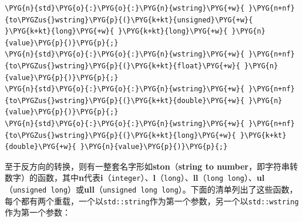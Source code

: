 \begin{codeblockbg}
\begin{Verbatim}[commandchars=\\\{\},breaklines=true,breakanywhere=true,fontsize=\codefont,xleftmargin=17bp]
\PYG{n}{std}\PYG{o}{:}\PYG{o}{:}\PYG{n}{wstring}\PYG{+w}{ }\PYG{n+nf}{to\PYGZus{}wstring}\PYG{p}{(}\PYG{k+kt}{unsigned}\PYG{+w}{ }\PYG{k+kt}{long}\PYG{+w}{ }\PYG{k+kt}{long}\PYG{+w}{ }\PYG{n}{value}\PYG{p}{)}\PYG{p}{;}
\PYG{n}{std}\PYG{o}{:}\PYG{o}{:}\PYG{n}{wstring}\PYG{+w}{ }\PYG{n+nf}{to\PYGZus{}wstring}\PYG{p}{(}\PYG{k+kt}{float}\PYG{+w}{ }\PYG{n}{value}\PYG{p}{)}\PYG{p}{;}
\PYG{n}{std}\PYG{o}{:}\PYG{o}{:}\PYG{n}{wstring}\PYG{+w}{ }\PYG{n+nf}{to\PYGZus{}wstring}\PYG{p}{(}\PYG{k+kt}{double}\PYG{+w}{ }\PYG{n}{value}\PYG{p}{)}\PYG{p}{;}
\PYG{n}{std}\PYG{o}{:}\PYG{o}{:}\PYG{n}{wstring}\PYG{+w}{ }\PYG{n+nf}{to\PYGZus{}wstring}\PYG{p}{(}\PYG{k+kt}{long}\PYG{+w}{ }\PYG{k+kt}{double}\PYG{+w}{ }\PYG{n}{value}\PYG{p}{)}\PYG{p}{;}
\end{Verbatim}
\end{codeblockbg}



至于反方向的转换，则有一整套名字形如\textbf{ston}（\textbf{string to number}，即字符串转数字）的函数，其中\textbf{n}代表\textbf{i}（\texttt{integer}）、\textbf{l}（\texttt{long}）、\textbf{ll}（\texttt{long long}）、\textbf{ul}（\texttt{unsigned long}）或\textbf{ull}（\texttt{unsigned long long}）。下面的清单列出了这些函数，每个都有两个重载，一个以\texttt{std::\allowbreak{}string}作为第一个参数，另一个以\texttt{std::\allowbreak{}wstring}作为第一个参数：



